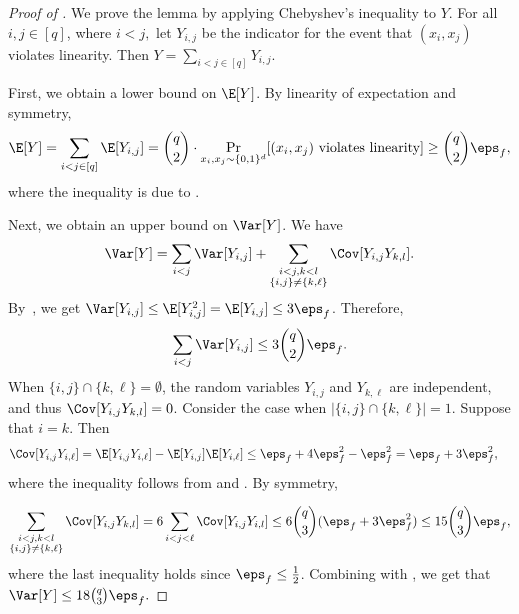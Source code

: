 \documentclass{toc}
\begin{document}
\begin{proof}[Proof of ]
We prove the lemma by applying Chebyshev's inequality to $Y$.
For all $i, j\in[q]$, where $i < j,$ let $Y_{i,j}$ be the indicator 
for the event that $(x_i, x_j)$ violates linearity.
Then $Y = \sum_{i < j \in [q]} Y_{i,j}$. 

First, we obtain a lower bound on $\E[Y]$.  By linearity of expectation and symmetry,
\begin{equation*}
    \E[Y]= \sum_{i < j \in [q]} \E[Y_{i,j}] 
    = \binom{q}{2}\cdot \Pr_{x_i, x_j \sim \{0,1\}^d}[(x_i, x_j) \textnormal{ violates linearity}] \geq \binom{q}{2}\eps_f,
\end{equation*}
where the inequality is due to \cite[Theorem 1.2]{BellareCHKS96}.


Next, we obtain an upper bound on $\Var[Y]$. We have
%
\[
%
  \Var[Y] = \sum_{i < j} \Var[Y_{i,j}] + \sum_{\substack{i<j,k<l \\ \{i,j\} \neq \{k,\ell\}   }} \Cov[Y_{i,j}Y_{k,l}].
\]
By~, we get $\Var[Y_{i,j}] 
\leq \E[Y^2_{i,j}]=\E[Y_{i,j}] \leq 3\eps_f$. Therefore,
\begin{equation}\label{eq:variance}
    \sum_{i < j} \Var[Y_{i,j}] \leq 3\binom{q}{2}\eps_f.
\end{equation}
%
When $\{i,j\} \cap \{k,\ell\} = \emptyset$, the random variables $Y_{i,j}$ and $Y_{k,\ell}$ are independent, and thus $\Cov[Y_{i,j}Y_{k,l}] = 0$. Consider the case when $|\{i,j\} \cap \{k,\ell\}| = 1$. Suppose that $i = k$. Then
\begin{align*}
    \Cov[Y_{i,j}Y_{i,\ell}] &= \E[Y_{i,j}Y_{i,\ell}]-\E[Y_{i,j}]\E[Y_{i,\ell}]
    \leq \eps_f + 4\eps_f^2 - \eps_f^2 = \eps_f + 3\eps_f^2,
\end{align*}
where the inequality follows from  and \cite[Theorem 1.2]{BellareCHKS96}. By symmetry,


\begin{equation}\label{eq:covariance}
  \sum_{\substack{i<j,k<l \\ \{i,j\} \neq \{k,\ell\}   }} \Cov[Y_{i,j}Y_{k,l}] = 6 \sum_{\substack{i < j < \ell}} \Cov[Y_{i,j}Y_{i,l}] \leq 6\binom{q}{3}(\eps_f + 3\eps_f^2) \leq 15\binom{q}{3} \eps_f,
\end{equation}
where the last inequality holds since $\eps_f \leq \frac{1}{2}$. 
Combining  with , we get that
$\Var[Y] \leq 18\binom{q}{3}\eps_f.$


\end{proof}
\end{document}
